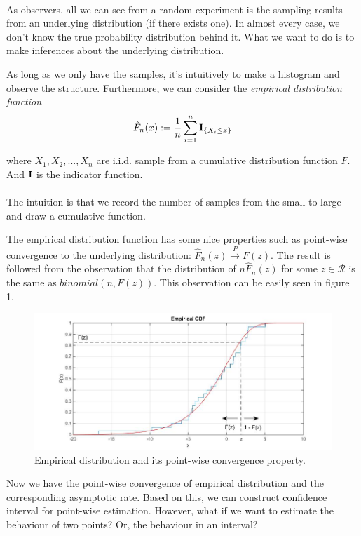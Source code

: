 \documentclass[a4paper, 11pt]{article} %
\begin{document}
\paragraph{}
As observers, all we can see from a random experiment is the sampling results from an underlying distribution (if there exists one). In almost every case, we don't know the true probability distribution behind it. What we want to do is to make inferences about the underlying distribution.

As long as we only have the samples, it's intuitively to make a histogram and observe the structure. Furthermore, we can consider the {\it empirical distribution function}
$$\hat{F}_n(x):=\frac{1}{n}\sum^{n}_{i=1}{\bf I}_{\{X_i\leq x\}}$$

where $X_1, X_2, ..., X_n$ are i.i.d. sample from a cumulative distribution function $F$. And ${\bf I}$ is the indicator function.

\paragraph{}
The intuition is that we record the number of samples from the small to large and draw a cumulative function.

The empirical distribution function has some nice properties such as point-wise convergence to the underlying distribution: $\hat{F}_n(z)\xrightarrow{P}F(z)$. The result is followed from the observation that the distribution of $n\hat{F}_n(z)$ for some $z\in\mathcal{R}$ is the same as $binomial(n, F(z))$. This observation can be easily seen in figure 1.
\begin{figure}[h]
\includegraphics[scale=0.4]{empiricaldistribution_1.jpg}
\caption{Empirical distribution and its point-wise convergence property.}
\end{figure}

Now we have the point-wise convergence of empirical distribution and the corresponding asymptotic rate. Based on this, we can construct confidence interval for point-wise estimation. However, what if we want to estimate the behaviour of two points? Or, the behaviour in an interval?
\end{document}
